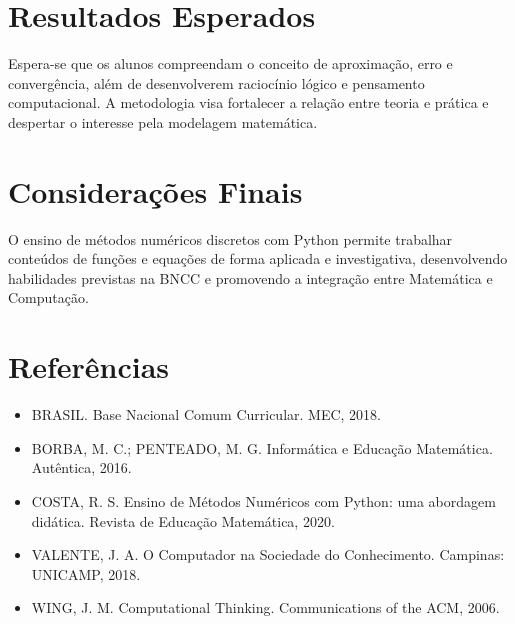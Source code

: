 \documentclass[12pt,a4paper]{report}
\begin{document}
	\newpage
	\chapter{Resultados Esperados}
	
	Espera-se que os alunos compreendam o conceito de aproximação, erro e convergência, além de desenvolverem raciocínio lógico e pensamento computacional. A metodologia visa fortalecer a relação entre teoria e prática e despertar o interesse pela modelagem matemática.
	
	\chapter{Considerações Finais}
	
	O ensino de métodos numéricos discretos com Python permite trabalhar conteúdos de funções e equações de forma aplicada e investigativa, desenvolvendo habilidades previstas na BNCC e promovendo a integração entre Matemática e Computação.
	
	\chapter*{Referências}
	\begin{itemize}
		\item BRASIL. Base Nacional Comum Curricular. MEC, 2018.
		\item BORBA, M. C.; PENTEADO, M. G. Informática e Educação Matemática. Autêntica, 2016.
		\item COSTA, R. S. Ensino de Métodos Numéricos com Python: uma abordagem didática. Revista de Educação Matemática, 2020.
		\item VALENTE, J. A. O Computador na Sociedade do Conhecimento. Campinas: UNICAMP, 2018.
		\item WING, J. M. Computational Thinking. Communications of the ACM, 2006.
	\end{itemize}
	
\end{document}
